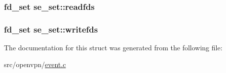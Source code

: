 \subsubsection[{readfds}]{\setlength{\rightskip}{0pt plus 5cm}fd\+\_\+set se\+\_\+set\+::readfds}\label{structse__set_ad1cb2f201590bb23bb61881fbe4ddf61}
\hypertarget{structse__set_a79de681d5da8c3a51b9db03f4ddfe7e6}{}
\subsubsection[{writefds}]{\setlength{\rightskip}{0pt plus 5cm}fd\+\_\+set se\+\_\+set\+::writefds}\label{structse__set_a79de681d5da8c3a51b9db03f4ddfe7e6}


The documentation for this struct was generated from the following file\+:\begin{DoxyCompactItemize}
\item 
src/openvpn/\hyperlink{event_8c}{event.\+c}\end{DoxyCompactItemize}
